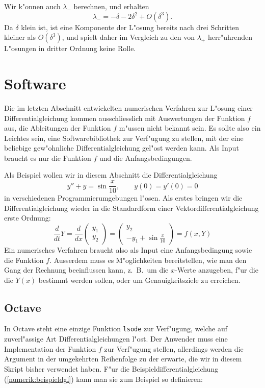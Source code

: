 Wir k"onnen auch $\lambda_-$ berechnen, und erhalten
\[
\lambda_-=-\delta-2\delta^2+O(\delta^3).
\]
Da $\delta$ klein ist, ist eine Komponente der L"osung bereits nach
drei Schritten kleiner als $O(\delta^3)$, und spielt daher im Vergleich
zu den von $\lambda_+$ herr"uhrenden L"osungen in dritter Ordnung keine
Rolle.

\section{Software}
Die im letzten Abschnitt entwickelten numerischen Verfahren zur L"osung
einer Differentialgleichung kommen ausschliesslich mit Auswertungen der
Funktion $f$ aus, die Ableitungen der Funktion $f$ m"ussen nicht bekannt
sein.
Es sollte also ein Leichtes sein, eine Softwarebibliothek zur
Verf"ugung zu stellen, mit der eine beliebige gew"ohnliche
Differentialgleichung gel"ost werden kann.
Als Input braucht es nur die Funktion $f$ und die Anfangsbedingungen.

Als Beispiel wollen wir in diesem Abschnitt die Differentialgleichung
\[
y''+y=\sin \frac{x}{10},\qquad y(0)=y'(0)=0
\]
in verschiedenen Programmierumgebungen l"osen.
Als erstes bringen wir die Differentialgleichung wieder in die Standardform
einer Vektordifferentialgleichung erste Ordnung:
\begin{equation}
\frac{d}{dt}Y
=
\frac{d}{dx}\begin{pmatrix}y_1\\y_2\end{pmatrix}
=
\begin{pmatrix}
y_2\\
-y_1+\sin\frac{x}{10}
\end{pmatrix}
=
f(x,Y)
\label{numerik:beispieldgl}
\end{equation}
Ein numerisches Verfahren braucht also als Input eine Anfangsbedingung
sowie die Funktion $f$.
Ausserdem muss es M"oglichkeiten bereitstellen, wie man den Gang der
Rechnung beeinflussen kann, z.~B.~um die $x$-Werte anzugeben, f"ur die
die $Y(x)$ bestimmt werden sollen, oder um Genauigkeitsziele zu erreichen.

\subsection{Octave}
In Octave steht eine einzige Funktion \texttt{lsode} zur Verf"ugung, welche
auf zuverl"assige Art Differentialgleichungen l"ost.
Der Anwender muss eine Implementation der Funktion $f$ zur Verf"ugung
stellen, allerdings werden die Argument in der umgekehrten Reihenfolge
zu der erwarte, die wir in diesem Skript bisher verwendet haben.
F"ur die Beispieldifferentialgleichung (\ref{numerik:beispieldgl})
kann man sie zum Beispiel so definieren:


